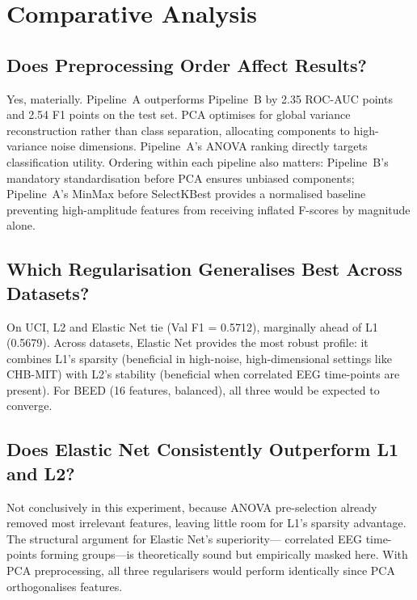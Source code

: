 \documentclass[conference]{IEEEtran}
\begin{document}
\section{Comparative Analysis}
\label{sec:comparison}

\subsection{Does Preprocessing Order Affect Results?}

Yes, materially. Pipeline~A outperforms Pipeline~B by 2.35 ROC-AUC
points and 2.54 F1 points on the test set. PCA optimises for global
variance reconstruction rather than class separation, allocating
components to high-variance noise dimensions. Pipeline~A's ANOVA ranking
directly targets classification utility. Ordering within each pipeline
also matters: Pipeline~B's mandatory standardisation before PCA ensures
unbiased components; Pipeline~A's MinMax before SelectKBest provides a
normalised baseline preventing high-amplitude features from receiving
inflated F-scores by magnitude alone.

\subsection{Which Regularisation Generalises Best Across Datasets?}

On UCI, L2 and Elastic Net tie (Val F1 = 0.5712), marginally ahead of
L1 (0.5679). Across datasets, Elastic Net provides the most robust
profile: it combines L1's sparsity (beneficial in high-noise,
high-dimensional settings like CHB-MIT) with L2's stability (beneficial
when correlated EEG time-points are present). For BEED (16 features,
balanced), all three would be expected to converge.

\subsection{Does Elastic Net Consistently Outperform L1 and L2?}

Not conclusively in this experiment, because ANOVA pre-selection already
removed most irrelevant features, leaving little room for L1's sparsity
advantage. The structural argument for Elastic Net's superiority---
correlated EEG time-points forming groups---is theoretically sound but
empirically masked here. With PCA preprocessing, all three regularisers
would perform identically since PCA orthogonalises features.
\end{document}
